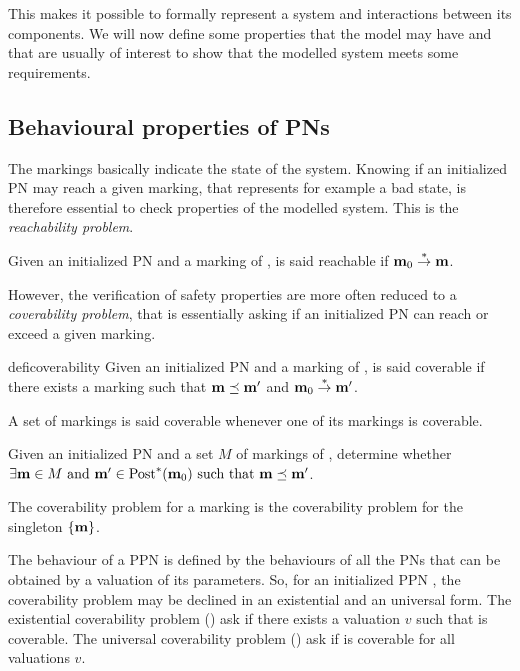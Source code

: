 This makes it possible to formally represent a system and interactions between its components. We will now define some properties that the model may have and that are usually of interest to show that the modelled system meets some requirements.

\subsection{Behavioural properties of \acp{PN}}

The markings basically indicate the state of the system.
Knowing if an initialized \ac{PN} may reach a given marking, that represents for example a bad state, is therefore essential to check properties of the modelled system.
This is the \emph{reachability problem}.

\begin{defi}[Reachability]
  Given an initialized \ac{PN} \NPTm and a marking \mar of \N, \mar is said reachable if $\mathbf{m}_0 \stackrel{*}{\to} \mathbf{m}$.
\end{defi}

However, the verification of safety properties are more often reduced to a \emph{coverability problem}, that is essentially asking if an initialized \ac{PN} can reach or exceed a given marking.

\begin{restatable}[Coverability]{defi}{coverability}
  Given an initialized \ac{PN} \NPTm and a marking \mar of \N, \mar is said coverable if there exists a marking \marp such that $\mathbf{m} \preceq \mathbf{m'}$ and $\mathbf{m}_0 \stackrel{*}{\to} \mathbf{m'}$.

  A set of markings is said coverable whenever one of its markings is coverable.
\end{restatable}

\begin{defi}
  Given an initialized \ac{PN} \NPTm and a set $M$ of markings of \N, determine whether $\exists \mathbf{m} \in M \text{ and } \mathbf{m'} \in \operatorname{Post}^*(\mathbf{m}_0) \text{ such that } \mathbf{m} \preceq \mathbf{m'}$.

  The coverability problem for a marking \mar is the coverability problem for the singleton $\{\mathbf{m}\}$.
\end{defi}

The behaviour of a \ac{PPN} is defined by the behaviours of all the \acp{PN} that can be obtained by a valuation of its parameters.
So, for an initialized \ac{PPN} \PPN, the coverability problem may be declined in an existential and an universal form.
The existential coverability problem (\Ecov) ask if there exists a valuation $v$ such that \mar is coverable.
The universal coverability problem (\Ucov) ask if \mar is coverable for all valuations $v$.

